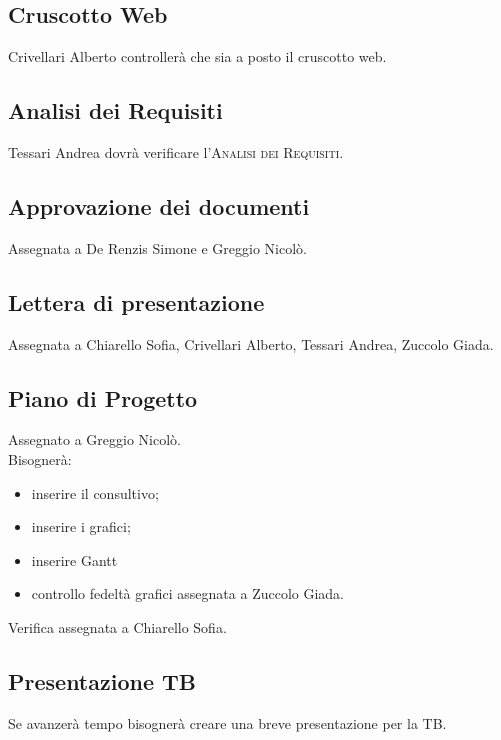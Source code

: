 \subsection{Cruscotto Web}
Crivellari Alberto controllerà che sia a posto il cruscotto web.

\subsection{Analisi dei Requisiti}
Tessari Andrea dovrà verificare l'\textsc{Analisi dei Requisiti}.

\subsection{Approvazione dei documenti}
Assegnata a De Renzis Simone e Greggio Nicolò.

\subsection{Lettera di presentazione}
Assegnata a Chiarello Sofia, Crivellari Alberto, Tessari Andrea, Zuccolo Giada.

\subsection{Piano di Progetto}
Assegnato a Greggio Nicolò.\\
Bisognerà:
\begin{itemize}
	\item inserire il consultivo;
	\item inserire i grafici;
	\item inserire Gantt
	\item controllo fedeltà grafici assegnata a Zuccolo Giada.
\end{itemize}
Verifica assegnata a Chiarello Sofia.

\subsection{Presentazione TB}
Se avanzerà tempo bisognerà creare una breve presentazione per la TB.

